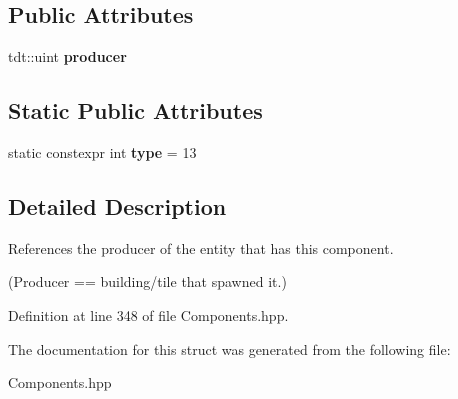 \subsection*{Public Attributes}
\begin{DoxyCompactItemize}
\item 
tdt\+::uint {\bfseries producer}\hypertarget{struct_product_component_a7e27a73608ff0670c2774909fc573e18}{}\label{struct_product_component_a7e27a73608ff0670c2774909fc573e18}

\end{DoxyCompactItemize}
\subsection*{Static Public Attributes}
\begin{DoxyCompactItemize}
\item 
static constexpr int {\bfseries type} = 13\hypertarget{struct_product_component_a9a7ca437ccf7aee4e6a624f214e12320}{}\label{struct_product_component_a9a7ca437ccf7aee4e6a624f214e12320}

\end{DoxyCompactItemize}


\subsection{Detailed Description}
References the producer of the entity that has this component. 

(Producer == building/tile that spawned it.) 

Definition at line 348 of file Components.\+hpp.



The documentation for this struct was generated from the following file\+:\begin{DoxyCompactItemize}
\item 
Components.\+hpp\end{DoxyCompactItemize}
